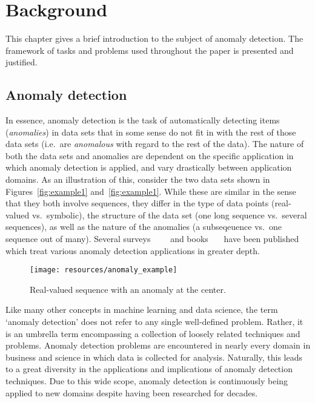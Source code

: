 \chapter{Background}
\label{ch:background}

This chapter gives a brief introduction to the subject of anomaly detection. The framework of tasks and problems used throughout the paper is presented and justified.

\section{Anomaly detection}
\label{sect:adb}

In essence, anomaly detection is the task of automatically detecting items (\emph{anomalies}) in data sets that in some sense do not fit in with the rest of those data sets (i.e.\ are \emph{anomalous} with regard to the rest of the data). The nature of both the data sets and anomalies are dependent on the specific application in which anomaly detection is applied, and vary drastically between application domains. As an illustration of this, consider the two data sets shown in Figures~\ref{fig:example1} and~\ref{fig:example1}. While these are similar in the sense that they both involve sequences, they differ in the type of data points (real-valued vs.\ symbolic), the structure of the data set (one long sequence vs.\ several sequences), as well as the nature of the anomalies (a subseqeuence vs.\ one sequence out of many). Several surveys~\cite{hodge}~\cite{bakar}~\cite{chandola}~\cite{agyemang} and books~\cite{barnett}~\cite{hawkins}~\cite{leroy} have been published which treat various anomaly detection applications in greater depth.

\begin{figure}[htb]
    \centering
    \texttt{[image: resources/anomaly\_example]}
    \caption{\small Real-valued sequence with an anomaly at the center.}
    \vspace{-0pt}
\label{fig:example2}
\end{figure}

Like many other concepts in machine learning and data science, the term `anomaly detection' does not refer to any single well-defined problem. Rather, it is an umbrella term encompassing a collection of loosely related techniques and problems. Anomaly detection problems are encountered in nearly every domain in business and science in which data is collected for analysis. Naturally, this leads to a great diversity in the applications and implications of anomaly detection techniques. Due to this wide scope, anomaly detection is continuously being applied to new domains despite having been researched for decades.

